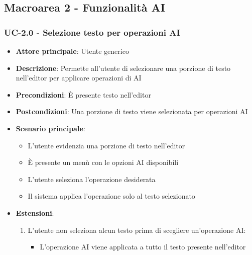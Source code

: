 \documentclass[11pt,a4paper]{article}
\begin{document}
\newpage

\subsection{Macroarea 2 - Funzionalità AI}
\subsubsection{UC-2.0 - Selezione testo per operazioni AI}
\begin{itemize}
    \item \textbf{Attore principale}: Utente generico
    \item \textbf{Descrizione}: Permette all’utente di selezionare una porzione di testo nell’editor per applicare operazioni di AI
    \item \textbf{Precondizioni}: È presente testo nell'editor
    \item \textbf{Postcondizioni}: Una porzione di testo viene selezionata per operazioni AI
    \item \textbf{Scenario principale}: 
        \begin{itemize}
            \item L'utente evidenzia una porzione di testo nell'editor
            \item È presente un menù con le opzioni AI disponibili
            \item L'utente seleziona l'operazione desiderata
            \item Il sistema applica l'operazione solo al testo selezionato
        \end{itemize}
    \item \textbf{Estensioni}: 
         \begin{enumerate}
            \item L'utente non seleziona alcun testo prima di scegliere un'operazione AI:
                \begin{itemize}
                    \item L'operazione AI viene applicata a tutto il testo presente nell'editor
                \end{itemize}
        \end{enumerate}
\end{itemize}
\end{document}
